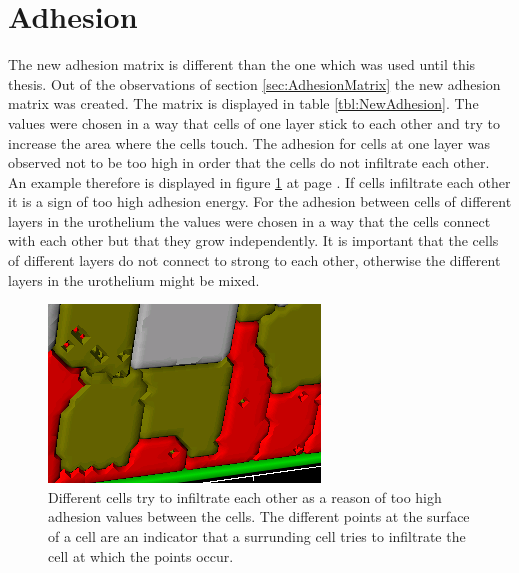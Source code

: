 \section{Adhesion}
The new adhesion matrix is different than the one which was used until this thesis. Out of the observations of section \ref{sec:AdhesionMatrix} the new adhesion matrix was created. The matrix is displayed in table \ref{tbl:NewAdhesion}. The values were chosen in a way that cells of one layer stick to each other and try to increase the area where the cells touch. The adhesion for cells at one layer was observed not to be too high in order that the cells do not infiltrate each other. An example therefore is displayed in figure \ref{img:InfiltratingCells} at page \pageref{img:InfiltratingCells}. If cells infiltrate each other it is a sign of too high adhesion energy. For the adhesion between cells of different layers in the urothelium the values were chosen in a way that the cells connect with each other but that they grow independently. It is important that the cells of different layers do not connect to strong to each other, otherwise the different layers in the urothelium might be mixed. 
\begin{figure}[ht]
	\center
	\includegraphics[scale=1.2]{figures/TooHighAdhesion1.png}
	\caption[Different cells try to infiltrate each other]{Different cells try to infiltrate each other as a reason of too high adhesion values between the cells. The different points at the surface of a cell are an indicator that a surrunding cell tries to infiltrate the cell at which the points occur.}
	\label{img:InfiltratingCells}
\end{figure}


